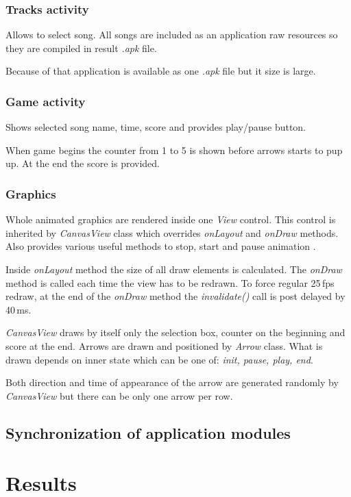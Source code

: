 \documentclass[conference]{IEEEtran}
\begin{document}
\subsubsection{Tracks activity}
Allows to select song. All songs are included as an application raw resources so they are compiled in result \emph{.apk} file.

Because of that application is available as one \emph{.apk} file but it size is large.


\subsubsection{Game activity}
Shows selected song name, time, score and provides play/pause button.

When game begins the counter from 1 to 5 is shown before arrows starts to pup up. At the end the score is provided.

\subsubsection{Graphics}
Whole animated graphics are rendered inside one \emph{View} control.
This control is inherited by \emph{CanvasView} class which overrides \emph{onLayout} and \emph{onDraw} methods. Also provides various useful methods to stop, start and pause animation \cite{Application}.

Inside \emph{onLayout} method the size of all draw elements is calculated.
The \emph{onDraw} method is called each time the view has to be redrawn. To force regular 25\,fps redraw, at the end of the \emph{onDraw} method the \emph{invalidate()} call is post delayed by 40\,ms.


\emph{CanvasView} draws by itself only the selection box, counter on the beginning and score at the end.
Arrows are drawn and positioned by \emph{Arrow} class.
What is drawn depends on inner state which can be one of: \emph{init, pause, play, end}.

Both direction and time of appearance of the arrow are generated randomly by \emph{CanvasView} but there can be only one arrow per row.

\subsection{Synchronization of application modules}



\section{Results}
\end{document}

